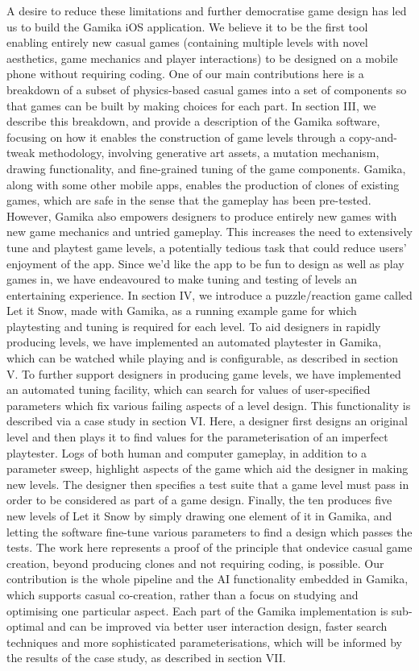 \documentclass{IEEEtran}
\begin{document}
A desire to reduce these limitations and further democratise
game design has led us to build the Gamika iOS application.
We believe it to be the first tool enabling entirely new casual
games (containing multiple levels with novel aesthetics, game
mechanics and player interactions) to be designed on a mobile
phone without requiring coding. One of our main contributions
here is a breakdown of a subset of physics-based casual games
into a set of components so that games can be built by
making choices for each part. In section III, we describe this
breakdown, and provide a description of the Gamika software,
focusing on how it enables the construction of game levels
through a copy-and-tweak methodology, involving generative
art assets, a mutation mechanism, drawing functionality, and
fine-grained tuning of the game components.
Gamika, along with some other mobile apps, enables the
production of clones of existing games, which are safe in
the sense that the gameplay has been pre-tested. However,
Gamika also empowers designers to produce entirely new
games with new game mechanics and untried gameplay. This
increases the need to extensively tune and playtest game levels,
a potentially tedious task that could reduce users’ enjoyment
of the app. Since we’d like the app to be fun to design as
well as play games in, we have endeavoured to make tuning
and testing of levels an entertaining experience. In section IV,
we introduce a puzzle/reaction game called Let it Snow, made
with Gamika, as a running example game for which playtesting
and tuning is required for each level. To aid designers in
rapidly producing levels, we have implemented an automated
playtester in Gamika, which can be watched while playing and
is configurable, as described in section V.
To further support designers in producing game levels,
we have implemented an automated tuning facility, which
can search for values of user-specified parameters which fix
various failing aspects of a level design. This functionality is
described via a case study in section VI. Here, a designer first
designs an original level and then plays it to find values for
the parameterisation of an imperfect playtester. Logs of both
human and computer gameplay, in addition to a parameter
sweep, highlight aspects of the game which aid the designer
in making new levels. The designer then specifies a test suite
that a game level must pass in order to be considered as part
of a game design. Finally, the ten produces five new levels of
Let it Snow by simply drawing one element of it in Gamika,
and letting the software fine-tune various parameters to find a
design which passes the tests.
The work here represents a proof of the principle that ondevice casual game creation, beyond producing clones and not
requiring coding, is possible. Our contribution is the whole
pipeline and the AI functionality embedded in Gamika, which
supports casual co-creation, rather than a focus on studying
and optimising one particular aspect. Each part of the Gamika
implementation is sub-optimal and can be improved via better
user interaction design, faster search techniques and more
sophisticated parameterisations, which will be informed by the
results of the case study, as described in section VII.
\end{document}
